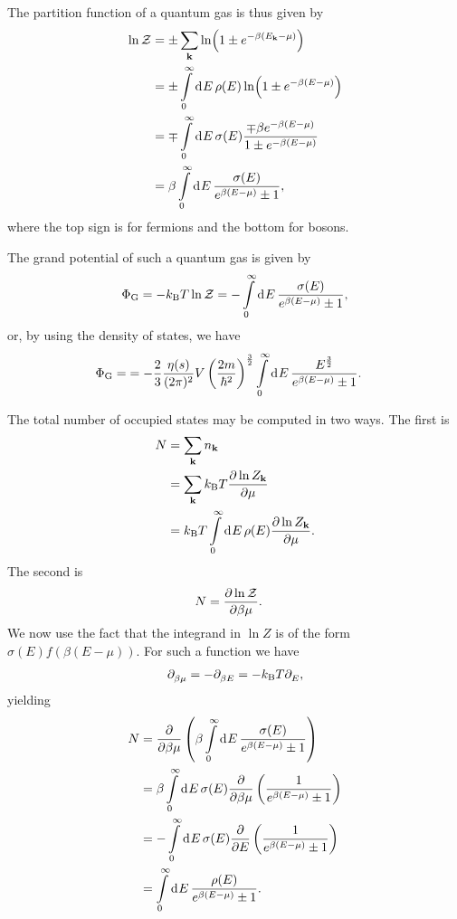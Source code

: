 The partition function of a quantum gas is thus given by
\begin{align*}
	\ln{\mathcal{Z}} &= \pm\sum\limits_{\vb{k}}\ln(1 \pm e^{-\beta(E_{\vb{k}} - \mu)}) \\
	        &= \pm\int\limits_{0}^{\infty}\dd[]{E}\rho(E)\ln(1 \pm e^{-\beta(E - \mu)}) \\
	        &= \mp\int\limits_{0}^{\infty}\dd[]{E}\sigma(E)\frac{\mp\beta e^{-\beta(E - \mu)}}{1 \pm e^{-\beta(E - \mu)}} \\
	        &= \beta\int\limits_{0}^{\infty}\dd[]{E}\frac{\sigma(E)}{e^{\beta(E - \mu)} \pm 1},
\end{align*}
where the top sign is for fermions and the bottom for bosons.

The grand potential of such a quantum gas is given by
\begin{align*}
	\Phi_{\text{G}} = -k_{\text{B}} T\ln{\mathcal{Z}} = -\int\limits_{0}^{\infty}\dd[]{E}\frac{\sigma(E)}{e^{\beta(E - \mu)} \pm 1},
\end{align*}
or, by using the density of states, we have
\begin{align*}
	\Phi_{\text{G}} = &=  -\frac{2}{3}\frac{\eta(s)}{(2\pi)^{2}}V\left(\frac{2m}{\hbar^{2}}\right)^{\frac{3}{2}}\int\limits_{0}^{\infty}\dd[]{E}\frac{E^{\frac{3}{2}}}{e^{\beta(E - \mu)} \pm 1}.
\end{align*}

The total number of occupied states may be computed in two ways. The first is
\begin{align*}
	N &= \sum\limits_{\vb{k}}n_{\vb{k}} \\
	  &= \sum\limits_{\vb{k}}k_{\text{B}} T\pdv{\ln{Z_{\vb{k}}}}{\mu} \\
	  &= k_{\text{B}} T\int\limits_{0}^{\infty}\dd[]{E}\rho(E)\pdv{\ln{Z_{\vb{k}}}}{\mu}.
\end{align*}
The second is
\begin{align*}
	N &= \pdv{\ln{\mathcal{Z}}}{\beta\mu}.
\end{align*}
We now use the fact that the integrand in $\ln{Z}$ is of the form $\sigma(E)f(\beta(E - \mu))$. For such a function we have
\begin{align*}
	\partial_{\beta\mu}^{} = -\partial_{\beta E}^{} = -k_{\text{B}} T\partial_{E}^{},
\end{align*}
yielding
\begin{align*}
	N &= \pdv{\beta\mu}\left(\beta\int\limits_{0}^{\infty}\dd[]{E}\frac{\sigma(E)}{e^{\beta(E - \mu)} \pm 1}\right) \\
	  &= \beta\int\limits_{0}^{\infty}\dd[]{E}\sigma(E)\pdv{\beta\mu}\left(\frac{1}{e^{\beta(E - \mu)} \pm 1}\right) \\
	  &= -\int\limits_{0}^{\infty}\dd[]{E}\sigma(E)\pdv{E}\left(\frac{1}{e^{\beta(E - \mu)} \pm 1}\right) \\
	  &= \int\limits_{0}^{\infty}\dd[]{E}\frac{\rho(E)}{e^{\beta(E - \mu)} \pm 1}.
\end{align*}

